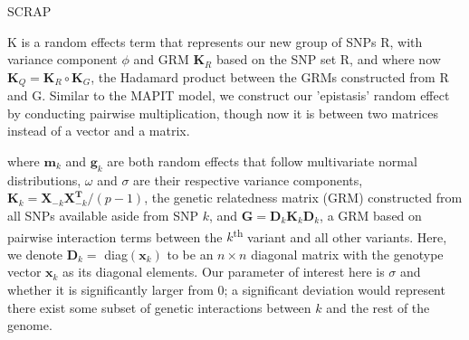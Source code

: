 \documentclass[12pt,a4paper]{article}
\newcommand{\red}[1]{\textcolor{red}{#1}}
\begin{document}
\nolinenumbers

\begingroup


\endgroup














\iffalse

SCRAP











K is a random effects term that represents our new group of SNPs R, with variance component $\phi$ and GRM $\textbf{K}_R$ based on the SNP set R, and where now $\textbf{K}_Q = \textbf{K}_R \circ \textbf{K}_G$, the Hadamard product between the GRMs constructed from R and G. Similar to the MAPIT model, we construct our 'epistasis' random effect by conducting pairwise multiplication, though now it is between two matrices instead of a vector and a matrix.

where $\textbf{m}_k$ and $\textbf{g}_k$ are both random effects that follow multivariate normal distributions, $\omega$ and $\sigma$ are their respective variance components, $\textbf{K}_k = \textbf{X}_{-k}\textbf{X}^{\textbf{T}}_{-k}/(p-1)$, the genetic relatedness matrix (GRM) constructed from all SNPs available aside from SNP $k$, and $\textbf{G} = \textbf{D}_k\textbf{K}_k\textbf{D}_k$, a GRM based on pairwise interaction terms between the $k$\textsuperscript{th} variant and all other variants. Here, we denote $\textbf{D}_k =$ diag$(\textbf{x}_k)$ to be an $n \times n$ diagonal matrix with the genotype vector $\textbf{x}_k$ as its diagonal elements. Our parameter of interest here is $\sigma$ and whether it is significantly larger from 0; a significant deviation would represent there exist some subset of genetic interactions between $k$ and the rest of the genome.

\end{document}
